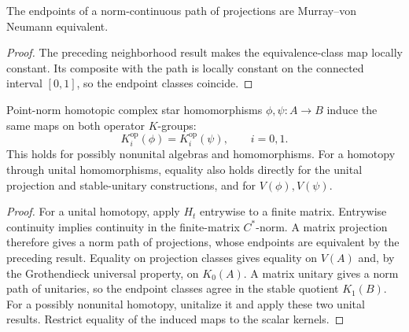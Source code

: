 \begin{proposition}\label{prop:projection-homotopy-invariance}
The endpoints of a norm-continuous path of projections are
Murray--von Neumann equivalent.
\end{proposition}
\begin{proof}
\leanok
The preceding neighborhood result makes the equivalence-class map locally
constant. Its composite with the path is locally constant on the connected
interval $[0,1]$, so the endpoint classes coincide.
\end{proof}

\begin{proposition}\label{prop:operator-k-homotopy-invariance}
Point-norm homotopic complex star homomorphisms $\phi,\psi:A\to B$ induce
the same maps on both operator $K$-groups:
\[
 K_i^{\mathrm{op}}(\phi)=K_i^{\mathrm{op}}(\psi),\qquad i=0,1.
\]
This holds for possibly nonunital algebras and homomorphisms. For a homotopy
through unital homomorphisms, equality also holds directly for the unital
projection and stable-unitary constructions, and for $V(\phi),V(\psi)$.
\end{proposition}
\begin{proof}
\leanok
For a unital homotopy, apply $H_t$ entrywise to a finite matrix.
Entrywise continuity implies continuity in the finite-matrix $C^*$-norm.
A matrix projection therefore gives a norm path of projections, whose
endpoints are equivalent by the preceding result. Equality on projection
classes gives equality on $V(A)$ and, by the Grothendieck universal property,
on $K_0(A)$. A matrix unitary gives a norm path of unitaries, so the endpoint
classes agree in the stable quotient $K_1(B)$.
For a possibly nonunital homotopy, unitalize it and apply these two unital
results. Restrict equality of the induced maps to the scalar kernels.
\end{proof}


